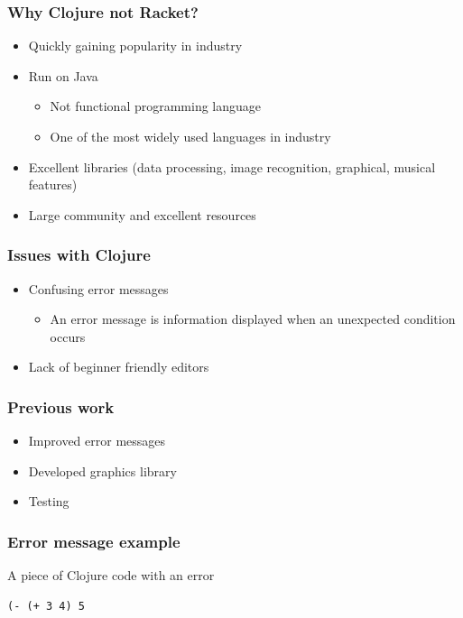 \documentclass{beamer}
\begin{document}
\begin{frame}
	\frametitle{Why Clojure not Racket?}
	\begin{itemize}
		\item Quickly gaining popularity in industry
		\item Run on Java
		\begin{itemize}
		\item Not functional programming language
		\item One of the most widely used languages in industry 
		\end{itemize}
		\item Excellent libraries (data processing, image recognition, graphical, musical features)
		\item Large community and excellent resources
	\end{itemize}
\end{frame}


\begin{frame}
	\frametitle{Issues with Clojure}
	\begin{itemize}
		\item Confusing error messages
		\begin{itemize}
		\item An error message is information displayed when an unexpected condition occurs
		\end{itemize}
		\item Lack of beginner friendly editors
	\end{itemize}
\end{frame}

\begin{frame}
	\frametitle{Previous work}
	\begin{itemize}
		\item Improved error messages
		\item Developed graphics library
		\item Testing
	\end{itemize}
\end{frame}

\begin{frame}[fragile]
\frametitle{Error message example}
A piece of Clojure code with an error
\begin{verbatim}
(- (+ 3 4) 5
\end{verbatim}
\end{frame}
\end{document}
